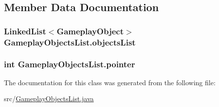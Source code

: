 \subsection{Member Data Documentation}
\hypertarget{classGameplayObjectsList_ae07f69f02fab6b47e861477fad9b6749}{
\subsubsection[{objects\-List}]{\setlength{\rightskip}{0pt plus 5cm}Linked\-List$<${\bf Gameplay\-Object}$>$ Gameplay\-Objects\-List.\-objects\-List\hspace{0.3cm}{\ttfamily [private]}}}\label{classGameplayObjectsList_ae07f69f02fab6b47e861477fad9b6749}
\hypertarget{classGameplayObjectsList_a21dae4e14c5c6f1e211dce81ef133129}{
\subsubsection[{pointer}]{\setlength{\rightskip}{0pt plus 5cm}int Gameplay\-Objects\-List.\-pointer\hspace{0.3cm}{\ttfamily [private]}}}\label{classGameplayObjectsList_a21dae4e14c5c6f1e211dce81ef133129}


The documentation for this class was generated from the following file\-:\begin{DoxyCompactItemize}
\item 
src/\hyperlink{GameplayObjectsList_8java}{Gameplay\-Objects\-List.\-java}\end{DoxyCompactItemize}
